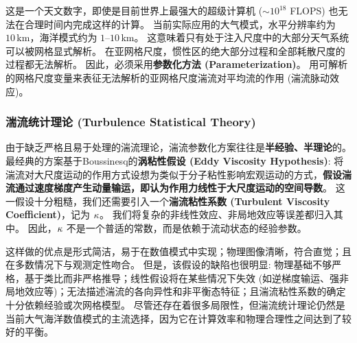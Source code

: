 这是一个天文数字，即使是目前世界上最强大的超级计算机 ($\sim 10^{18}$ FLOPS) 也无法在合理时间内完成这样的计算。
当前实际应用的大气模式，水平分辨率约为 $10\,\mathrm{km}$，海洋模式约为 $1 \text{--} 10\,\mathrm{km}$。
这意味着只有处于注入尺度中的大部分天气系统可以被网格显式解析。
在亚网格尺度，惯性区的绝大部分过程和全部耗散尺度的过程都无法解析。
因此，必须采用\textbf{参数化方法 (Parameterization)}。
用可解析的网格尺度变量来表征无法解析的亚网格尺度湍流对平均流的作用 (湍流脉动效应)。

\subsubsection{湍流统计理论 (Turbulence Statistical Theory)}

由于缺乏严格且易于处理的湍流理论，湍流参数化方案往往是\textbf{半经验、半理论}的。
最经典的方案基于Boussinesq的\textbf{涡粘性假设 (Eddy Viscosity Hypothesis)}: 将湍流对大尺度运动的作用方式设想为类似于分子粘性影响宏观运动的方式，\textbf{假设湍流通过速度梯度产生动量输运，即认为作用力线性于大尺度运动的空间导数}。
这一假设十分粗糙，我们还需要引入一个\textbf{湍流粘性系数 (Turbulent Viscosity Coefficient)}，记为 $\kappa$。
我们将复杂的非线性效应、非局地效应等误差都归入其中。
因此，$\kappa$ 不是一个普适的常数，而是依赖于流动状态的经验参数。

这样做的优点是形式简洁，易于在数值模式中实现；物理图像清晰，符合直觉；且在多数情况下与观测定性吻合。
但是，该假设的缺陷也很明显: 物理基础不够严格，基于类比而非严格推导；线性假设将在某些情况下失效 (如逆梯度输运、强非局地效应等)；无法描述湍流的各向异性和非平衡态特征；且湍流粘性系数的确定十分依赖经验或次网格模型。
尽管还存在着很多局限性，但湍流统计理论仍然是当前大气海洋数值模式的主流选择，因为它在计算效率和物理合理性之间达到了较好的平衡。

